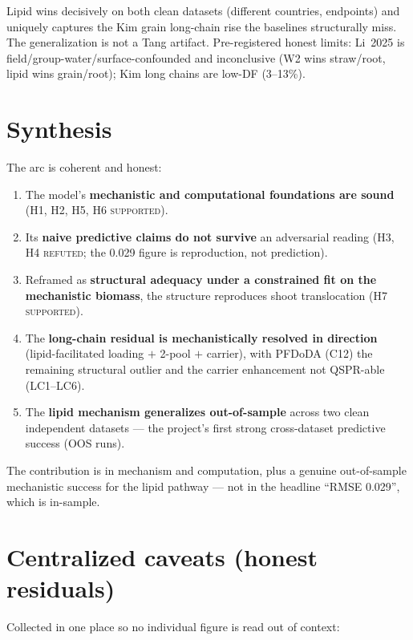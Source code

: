 \documentclass[11pt]{article}
\begin{document}
Lipid wins decisively on both clean datasets (different countries,
endpoints) and uniquely captures the Kim grain long-chain rise the
baselines structurally miss. The generalization is not a Tang
artifact. Pre-registered honest limits: Li~2025 is
field/group-water/surface-confounded and inconclusive (W2 wins
straw/root, lipid wins grain/root); Kim long chains are low-DF
(3--13\%).

\section{Synthesis}
\label{sec:synthesis}

The arc is coherent and honest:
\begin{enumerate}
  \item The model's \textbf{mechanistic and computational
        foundations are sound} (H1, H2, H5, H6 \textsc{supported}).
  \item Its \textbf{naive predictive claims do not survive} an
        adversarial reading (H3, H4 \textsc{refuted}; the 0.029 figure
        is reproduction, not prediction).
  \item Reframed as \textbf{structural adequacy under a constrained
        fit on the mechanistic biomass}, the structure reproduces
        shoot translocation (H7 \textsc{supported}).
  \item The \textbf{long-chain residual is mechanistically resolved in
        direction} (lipid-facilitated loading $+$ 2-pool $+$ carrier),
        with PFDoDA (C12) the remaining structural outlier and the
        carrier enhancement not QSPR-able (LC1--LC6).
  \item The \textbf{lipid mechanism generalizes out-of-sample} across
        two clean independent datasets --- the project's first strong
        cross-dataset predictive success (OOS runs).
\end{enumerate}

The contribution is in mechanism and computation, plus a genuine
out-of-sample mechanistic success for the lipid pathway --- not in the
headline ``RMSE 0.029'', which is in-sample.

\section{Centralized caveats (honest residuals)}
\label{sec:caveats}

Collected in one place so no individual figure is read out of context:
\end{document}
